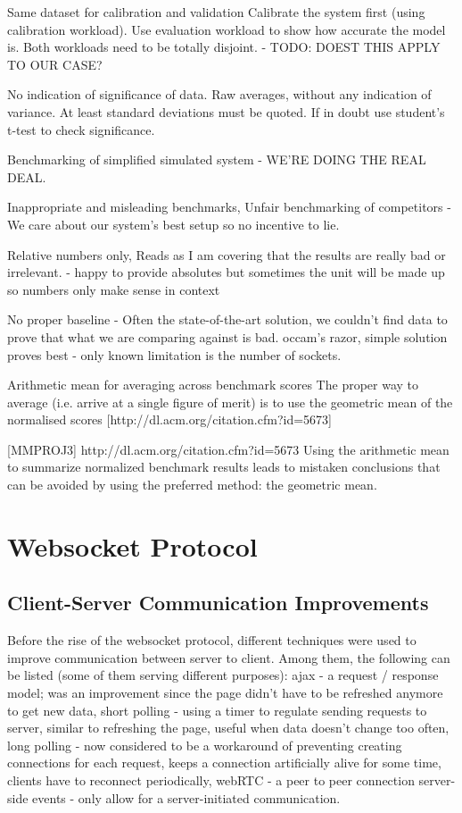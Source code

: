 \documentclass{uvamscse}
\begin{document}
Same dataset for calibration and validation
Calibrate the system first (using calibration workload). Use evaluation workload to show how accurate the model is. Both workloads need to be totally disjoint. - TODO: DOEST THIS APPLY TO OUR CASE?

No indication of significance of data.
Raw averages, without any indication of variance. At least standard deviations must be quoted. If in doubt use student's t-test to check significance.

Benchmarking of simplified simulated system - WE'RE DOING THE REAL DEAL.

Inappropriate and misleading benchmarks, Unfair benchmarking of competitors - We care about our system's best setup so no incentive to lie.

Relative numbers only, Reads as I am covering that the results are really bad or irrelevant. - happy to provide absolutes but sometimes the unit will be made up so numbers only make sense in context

No proper baseline - Often the state-of-the-art solution, we couldn't find data to prove that what we are comparing against is bad. occam's razor, simple solution proves best - only known limitation is the number of sockets.

Arithmetic mean for averaging across benchmark scores
The proper way to average (i.e. arrive at a single figure of merit) is to use the geometric mean of the normalised scores [http://dl.acm.org/citation.cfm?id=5673]

[MMPROJ3] http://dl.acm.org/citation.cfm?id=5673
Using the arithmetic mean to summarize normalized benchmark results leads to mistaken conclusions that can be avoided by using the preferred method: the geometric mean.

\section{Websocket Protocol}

\subsection{Client-Server Communication Improvements}\label{Client-Server Communication Improvements}
Before the rise of the websocket protocol, different techniques were used to improve communication between server to client. Among them, the following can be listed (some of them serving different purposes):
ajax - a request / response model; was an improvement since the page didn’t have to be refreshed anymore to get new data,
short polling - using a timer to regulate sending requests to server, similar to refreshing the page, useful when data doesn’t change too often,
long polling - now considered to be a workaround of preventing creating connections for each request, keeps a connection artificially alive for some time, clients have to reconnect periodically,
webRTC - a peer to peer connection
server-side events - only allow for a server-initiated communication.
\end{document}
